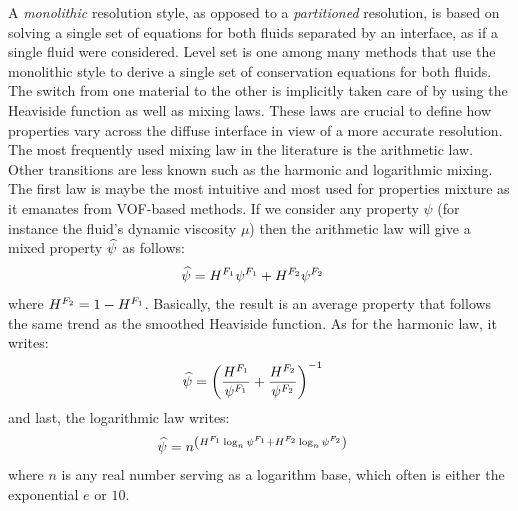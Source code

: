 A \emph{monolithic} resolution style, as opposed to a \emph{partitioned} resolution, is based on solving a single set of equations
for both fluids separated by an interface, as if a single fluid were considered. 
Level set is one among many methods that use the monolithic style to derive a single set of conservation equations
for both fluids. The switch from one material to the other is implicitly taken care of by using the Heaviside function as well as mixing laws. 
These laws are crucial to define how properties vary across the diffuse interface in view of a more accurate resolution.
The most frequently used mixing law in the literature is the arithmetic law. Other transitions are less known such as 
the harmonic and logarithmic mixing. The first law is maybe the most intuitive and most used for properties mixture as it emanates
from VOF-based methods. If we consider any property $\psi$ (for instance the fluid's dynamic viscosity $\mu$) then the arithmetic 
law will give a mixed property $\widehat{\psi}$ as follows:
\begin{align}
\label{eq:arithmetic}
\widehat{\psi} &= H^{F_1} \psi^{F_1} + H^{F_2} \psi^{F_2}
\end{align}
where $H^{F_2}=1-H^{F_1}$. 
Basically, the result is an average property that follows the same trend as the smoothed Heaviside function. As for the harmonic law, it writes:
\begin{align}
\label{eq:harmonic}
\widehat{\psi} &= \left( \frac{H^{F_1}}{\psi^{F_1}} + \frac{H^{F_2}}{\psi^{F_2}}  \right)^{-1}
\end{align}
and last, the logarithmic law writes:
\begin{align}
\label{eq:logarithmic}
\widehat{\psi} &=  n^{\left( H^{F_1} \log_n \psi^{F_1} + H^{F_2} \log_n \psi^{F_2} \right)}
\end{align}
where $n$ is any real number serving as a logarithm base, which often is either the exponential $e$ or $10$.

